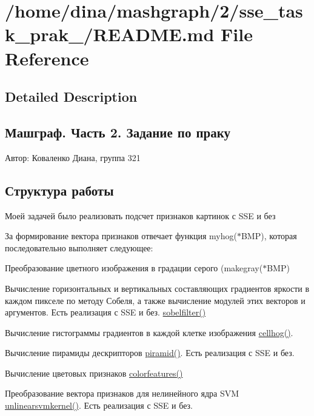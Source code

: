 \hypertarget{_r_e_a_d_m_e_8md}{\section{/home/dina/mashgraph/2/sse\-\_\-task\-\_\-prak\-\_/\-R\-E\-A\-D\-M\-E.md File Reference}
\label{_r_e_a_d_m_e_8md}
}


\subsection{Detailed Description}
\subsection*{Машграф. Часть 2. Задание по праку }

Автор\-: Коваленко Диана, группа 321

\subsection*{Структура работы }

Моей задачей было реализовать подсчет признаков картинок с S\-S\-E и без

За формирование вектора признаков отвечает функция myhog($\ast$\-B\-M\-P), которая последовательно выполняет следующее\-:


\begin{DoxyItemize}
\item Преобразование цветного изображения в градации серого (makegray($\ast$\-B\-M\-P)
\item Вычисление горизонтальных и вертикальных составляющих градиентов яркости в каждом пикселе по методу Собеля, а также вычисление модулей этих векторов и аргументов. Есть реализация с S\-S\-E и без. \hyperlink{mycode_8cpp_a8329cdf91c6f2409b5af537793c6d0da}{sobelfilter()}
\item Вычисление гистограммы градиентов в каждой клетке изображения \hyperlink{mycode_8cpp_a01022a402a859e09ed2bb0ae3b88ae9b}{cellhog()}.
\item Вычисление пирамиды дескрипторов \hyperlink{dop_8cpp_a10901fc7716198de2e003ddb4c918802}{piramid()}. Есть реализация с S\-S\-E и без.
\item Вычисление цветовых признаков \hyperlink{dop_8cpp_a6af5688c03787a6b2aef1690f8f3f074}{colorfeatures()}
\item Преобразование вектора признаков для нелинейного ядра S\-V\-M \hyperlink{dop_8cpp_a618f8cc9cbf4a1a317a82855a9fa131e}{unlinearsvmkernel()}. Есть реализация с S\-S\-E и без.
\end{DoxyItemize}

